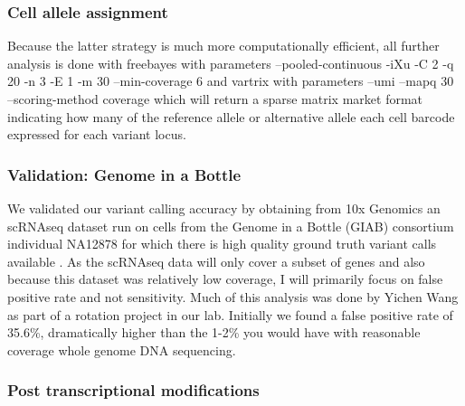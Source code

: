 \subsubsection{Cell allele assignment}
Because 
the latter strategy is much more computationally efficient, all further analysis is done with freebayes with parameters --pooled-continuous -iXu -C 2 -q 20 -n 3 -E 1 -m 30 --min-coverage 6 and vartrix with parameters  --umi --mapq 30 --scoring-method coverage which will return a sparse matrix market format indicating how many of the reference allele or alternative allele each cell barcode expressed for each variant locus.

\subsubsection{Validation: Genome in a Bottle}

We validated our variant calling accuracy by obtaining from 10x Genomics an scRNAseq dataset run on cells from the Genome in a Bottle (GIAB) consortium individual NA12878 for which there is high quality ground truth variant calls available \cite{giab}. As the scRNAseq data will only cover a subset of genes and also because this dataset was relatively low coverage, I will primarily focus on false positive rate and not sensitivity. Much of this analysis was done by Yichen Wang as part of a rotation project in our lab. Initially we found a false positive rate of 35.6\%, dramatically higher than the 1-2\% you would have with reasonable coverage whole genome DNA sequencing. 



\subsubsection{Post transcriptional modifications}

